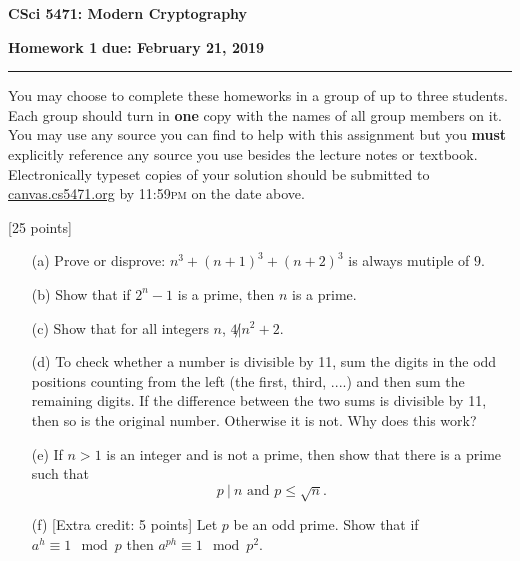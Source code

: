 \documentclass[11pt]{article}
\newcounter{qnum}
\newcommand{\question}[1]{\stepcounter{qnum}\bigskip\noindent{\bf \arabic{qnum}. #1.}}
\begin{document}
\begin{center}
{\Large \bf CSci 5471: Modern Cryptography}
\end{center}
{\bf Homework 1} \hfill {\bf due: February 21, 2019}
\medskip
\hrule
\medskip
{} You may choose to complete these
homeworks in a group of up to three students.  Each group should turn
in {\bf one} copy with the names of all group members on it.  You may
use any source you can find to help with this assignment but you {\bf
  must} explicitly reference any source you use besides the lecture
notes or textbook.  Electronically typeset copies of your solution
should be submitted to \url{canvas.cs5471.org} by 11:59\textsc{pm} on the
date above.

\question{Number Theory I}[25 points]
\begin{itemize}
  \item[(a)] Prove or disprove: $n^3 + (n+1)^3 + (n+2)^3$ is always
    mutiple of $9$.
  \item[(b)] Show that if $2^n-1$ is a prime, then $n$ is a prime.
  \item[(c)] Show that for all integers $n$, $4 \not| n^2 +2$.
  \item[(d)] To check whether a number is divisible by 11, sum the
    digits in the odd positions counting from the left (the first, third, ....)
    and then sum the remaining digits.  If the difference between the two sums
    is divisible by 11, then so is the original number. Otherwise it is not.
    Why does this work?
  \item[(e)] If $n>1$ is an integer and is not a prime, then show that
  there is a prime such that
  $$
  p ~|~ n \text{ and } p \leq \sqrt{n}.
  $$
 \item[(f)] [Extra credit: 5 points] Let $p$ be an odd prime. Show that if $a^h\equiv 1\mod p$ then
    $a^{ph} \equiv 1\mod p^2$.
\end{itemize}

\newpage
\end{document}
